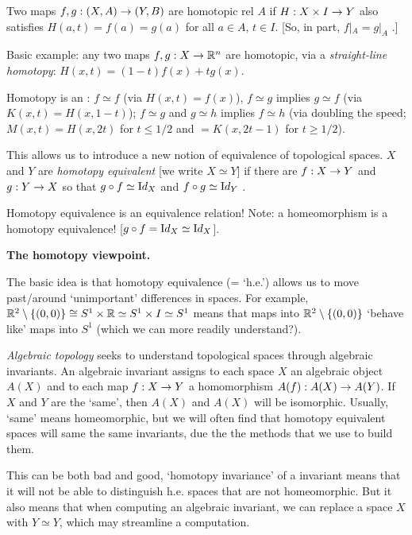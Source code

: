 \documentclass[12pt]{article}
\begin{document}
\ssk

Two maps $f,g:(X,A)\rightarrow (Y,B)$ are homotopic rel $A$ if 
$H:X\times I\rightarrow Y$ also satisfies $H(a,t)=f(a)=g(a)$ for all $a\in A$, $t\in I$.
[So, in part, $f|_A=g|_A$ .]

\ssk

Basic example: any two maps $f,g:X\rightarrow {\mathbb R}^n$ are homotopic, via a
{\it straight-line homotopy}: $H(x,t)=(1-t)f(x)+tg(x)$.

\msk

Homotopy is an  : $f\simeq f$  (via $H(x,t)=f(x)$),
$f\simeq g$ implies $g\simeq f$ (via $K(x,t)=H(x,1-t)$); 
$f\simeq g$ and $g\simeq h$ implies $f\simeq h$ (via doubling the speed;
$M(x,t)=H(x,2t)$ for $t\leq 1/2$ and $=K(x,2t-1)$ for $t\geq 1/2$).

\ssk

This allows us to introduce a new notion of equivalence of topological spaces.
$X$ and $Y$ are {\it homotopy equivalent} [we write $X\simeq Y$]
if there are $f:X\rightarrow Y$ and $g:Y\rightarrow X$ so that $g\circ f\simeq {\textrm Id}_X$
and $f\circ g\simeq{\textrm Id}_Y$ . 

\ssk

Homotopy equivalence is an equivalence relation! Note: a homeomorphism is a
homotopy equivalence! [$g\circ f = {\textrm Id}_X\simeq {\textrm Id}_X$].

\msk

{\bf The homotopy viewpoint.}

\ssk

The basic idea is that homotopy equivalence  (= `h.e.') 
allows us to move past/around
`unimportant' differences in spaces. For example, 
${\mathbb R}^2\setminus\{(0,0)\}\cong S^1\times{\mathbb R}\simeq S^1\times I\simeq S^1$
means that maps into ${\mathbb R}^2\setminus\{(0,0)\}$ `behave like' maps
into $S^1$ (which we can more readily understand?).

\ssk

{\it Algebraic topology} seeks to understand topological spaces through
algebraic invariants. An algebraic invariant assigns to each space $X$ an 
algebraic object $A(X)$ and to each map $f:X\rightarrow Y$ a 
homomorphism $A(f):A(X)\rightarrow A(Y)$. If $X$ and $Y$ are the `same', then 
$A(X)$ and $A(X)$ will be isomorphic. Usually, `same' means homeomorphic,
but we will often find that homotopy equivalent spaces will 
same the same invariants, due the the methods that we use to build 
them.

\ssk

This can be both bad and good, `homotopy invariance' of a invariant means
that it will not be able to distinguish h.e. spaces that are not homeomorphic.
But it also means that when computing an algebraic invariant, we can replace
a space $X$ with $Y\simeq Y$, which may streamline a computation.
\end{document}
